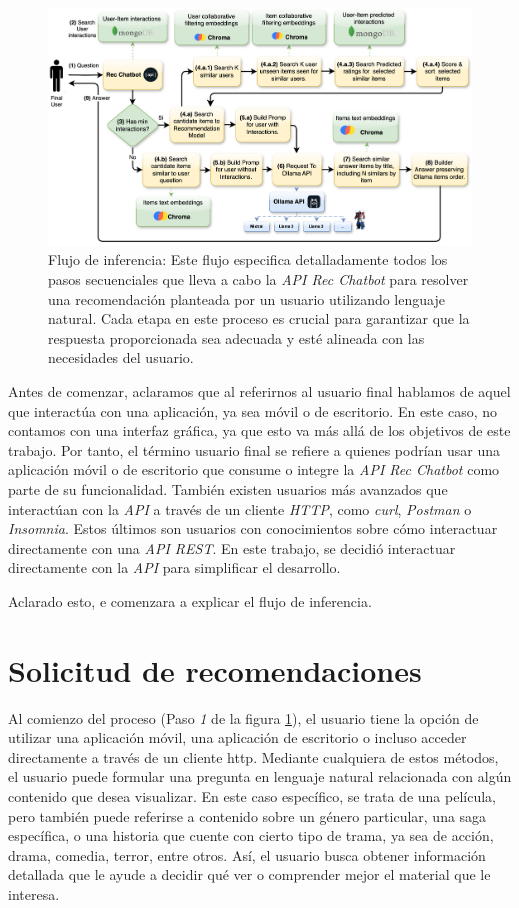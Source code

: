 \documentclass[11pt,a4paper,twoside]{thesis}
\begin{document}
\begin{figure}[H]
	\centering
	\label{fig:inference-flow}
	\includegraphics[width=12.5cm]{./images/inference.flow.png}
	\caption{Flujo de inferencia: Este flujo especifica detalladamente todos los pasos secuenciales que lleva a cabo la \textit{API Rec Chatbot} para resolver una recomendación planteada por un usuario utilizando lenguaje natural. Cada etapa en este proceso es crucial para garantizar que la respuesta proporcionada sea adecuada y esté alineada con las necesidades del usuario.}
\end{figure}


Antes de comenzar, aclaramos que al referirnos al usuario final hablamos de aquel que interactúa con una aplicación, ya sea móvil o de escritorio. En este caso, no contamos con una interfaz gráfica, ya que esto va más allá de los objetivos de este trabajo. Por tanto, el término usuario final se refiere a quienes podrían usar una aplicación móvil o de escritorio que consume o integre la \textit{API Rec Chatbot} como parte de su funcionalidad. También existen usuarios más avanzados que interactúan con la \textit{API} a través de un cliente \textit{HTTP}, como \textit{curl}, \textit{Postman} o \textit{Insomnia}. Estos últimos son usuarios con conocimientos sobre cómo interactuar directamente con una \textit{API REST}. En este trabajo, se decidió interactuar directamente con la \textit{API} para simplificar el desarrollo.

Aclarado esto, e comenzara a explicar el flujo de inferencia.


\section{Solicitud de recomendaciones}

Al comienzo del proceso (Paso \textit{1} de la figura \ref{fig:inference-flow}), el usuario tiene la opción de utilizar una aplicación móvil, una aplicación de escritorio o incluso acceder directamente a través de un cliente http. Mediante cualquiera de estos métodos, el usuario puede formular una pregunta en lenguaje natural relacionada con algún contenido que desea visualizar. En este caso específico, se trata de una película, pero también puede referirse a contenido sobre un género particular, una saga específica, o una historia que cuente con cierto tipo de trama, ya sea de acción, drama, comedia, terror, entre otros. Así, el usuario busca obtener información detallada que le ayude a decidir qué ver o comprender mejor el material que le interesa.
\end{document}
